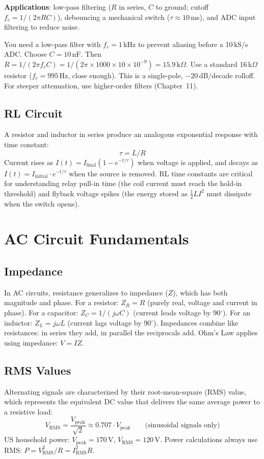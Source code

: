 \documentclass[11pt,letterpaper,twoside,openany]{book}
\begin{document}
\textbf{Applications}: low-pass filtering ($R$ in series, $C$ to ground; cutoff $f_c = 1/(2\pi RC)$), debouncing a mechanical switch ($\tau \approx 10$\,ms), and ADC input filtering to reduce noise.

\begin{examplebox}
You need a low-pass filter with $f_c = 1$\,kHz to prevent aliasing before a 10\,kS/s ADC. Choose $C = 10$\,nF. Then $R = 1/(2\pi f_c C) = 1/(2\pi \times 1000 \times 10 \times 10^{-9}) = 15.9\,\text{k}\Omega$. Use a standard 16\,k$\Omega$ resistor ($f_c = 995$\,Hz, close enough). This is a single-pole, $-20$\,dB/decade rolloff. For steeper attenuation, use higher-order filters (Chapter~11).
\end{examplebox}

\subsection{RL Circuit}
A resistor and inductor in series produce an analogous exponential response with time constant:
\begin{equation}
\tau = L/R
\end{equation}
Current rises as $I(t) = I_{\text{final}}(1 - e^{-t/\tau})$ when voltage is applied, and decays as $I(t) = I_{\text{initial}} \cdot e^{-t/\tau}$ when the source is removed. RL time constants are critical for understanding relay pull-in time (the coil current must reach the hold-in threshold) and flyback voltage spikes (the energy stored as $\frac{1}{2}LI^2$ must dissipate when the switch opens).

\section{AC Circuit Fundamentals}

\subsection{Impedance}
In AC circuits, resistance generalizes to impedance ($Z$), which has both magnitude and phase. For a resistor: $Z_R = R$ (purely real, voltage and current in phase). For a capacitor: $Z_C = 1/(j\omega C)$ (current leads voltage by 90$^\circ$). For an inductor: $Z_L = j\omega L$ (current lags voltage by 90$^\circ$). Impedances combine like resistances: in series they add, in parallel the reciprocals add. Ohm's Law applies using impedance: $V = IZ$.

\subsection{RMS Values}
Alternating signals are characterized by their root-mean-square (RMS) value, which represents the equivalent DC value that delivers the same average power to a resistive load:
\begin{equation}
V_{\text{RMS}} = \frac{V_{\text{peak}}}{\sqrt{2}} \approx 0.707 \cdot V_{\text{peak}} \qquad \text{(sinusoidal signals only)}
\end{equation}
US household power: $V_{\text{peak}} = 170$\,V, $V_{\text{RMS}} = 120$\,V. Power calculations always use RMS: $P = V_{\text{RMS}}^2/R = I_{\text{RMS}}^2 R$.
\end{document}
